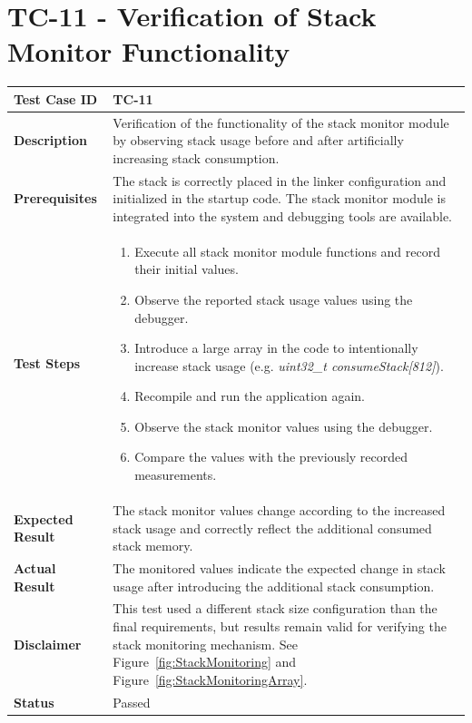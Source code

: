 \newpage
\section{TC-11 - Verification of Stack Monitor Functionality}
\label{sec:tc14}

\renewcommand{\arraystretch}{1.4}

\begin{table}[H]
\centering
\begin{tabular}{|p{}|p{}|}
\hline
\textbf{Test Case ID} & TC-11 \\ \hline
\textbf{Description} & Verification of the functionality of the stack monitor module by observing stack usage before and after artificially increasing stack consumption. \\ \hline
\textbf{Prerequisites} & The stack is correctly placed in the linker configuration and initialized in the startup code. The stack monitor module is integrated into the system and debugging tools are available. \\ \hline
\textbf{Test Steps} &
\begin{enumerate}
\item Execute all stack monitor module functions and record their initial values.
\item Observe the reported stack usage values using the debugger.
\item Introduce a large array in the code to intentionally increase stack usage (e.g. \textit{uint32\_t consumeStack[812]}).
\item Recompile and run the application again.
\item Observe the stack monitor values using the debugger.
\item Compare the values with the previously recorded measurements.
\end{enumerate}
\\ \hline
\textbf{Expected Result} & The stack monitor values change according to the increased stack usage and correctly reflect the additional consumed stack memory. \\ \hline
\textbf{Actual Result} & The monitored values indicate the expected change in stack usage after introducing the additional stack consumption. \\ \hline
\textbf{Disclaimer} & This test used a different stack size configuration than the final requirements, but results remain valid for verifying the stack monitoring mechanism. See Figure~\ref{fig:StackMonitoring} and Figure~\ref{fig:StackMonitoringArray}. \\ \hline
\textbf{Status} & \textcolor{green!60!black}{Passed} \\ \hline
\end{tabular}
\end{table}

